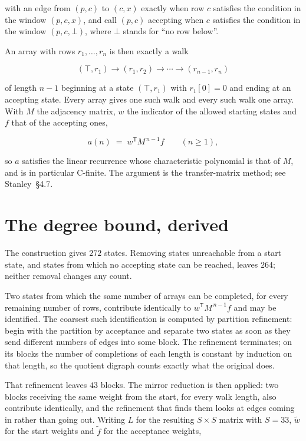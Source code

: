 \documentclass[11pt]{article}
\theoremstyle{definition}
\begin{document}
with an edge from $(p,c)$ to $(c,x)$ exactly when row $c$ satisfies the condition in the window $(p,c,x)$, and call $(p,c)$ accepting when $c$ satisfies the condition in the window $(p,c,\bot)$, where $\bot$ stands for ``no row below''.

An array with rows $r_1,\dots,r_n$ is then exactly a walk

\[(\top,r_1) \to (r_1,r_2) \to \cdots \to (r_{n-1},r_n)\]

of length $n-1$ beginning at a state $(\top,r_1)$ with $r_1[0]=0$ and ending at an accepting state. Every array gives one such walk and every such walk one array. With $M$ the adjacency matrix, $w$ the indicator of the allowed starting states and $f$ that of the accepting ones,

\[a(n) \;=\; w^{\mathsf T} M^{\,n-1} f \qquad (n \ge 1),\]

so $a$ satisfies the linear recurrence whose characteristic polynomial is that of $M$, and is in particular C-finite. The argument is the transfer-matrix method; see Stanley~\S4.7.

\section{The degree bound, derived}

The construction gives $272$ states. Removing states unreachable from a start state, and states from which no accepting state can be reached, leaves $264$; neither removal changes any count.

Two states from which the same number of arrays can be completed, for every remaining number of rows, contribute identically to $w^{\mathsf T}M^{\,n-1}f$ and may be identified. The coarsest such identification is computed by partition refinement: begin with the partition by acceptance and separate two states as soon as they send different numbers of edges into some block. The refinement terminates; on its blocks the number of completions of each length is constant by induction on that length, so the quotient digraph counts exactly what the original does.

That refinement leaves $43$ blocks. The mirror reduction is then applied: two blocks receiving the same weight from the start, for every walk length, also contribute identically, and the refinement that finds them looks at edges coming in rather than going out. Writing $L$ for the resulting $S \times S$ matrix with $S = 33$, $\tilde w$ for the start weights and $\tilde f$ for the acceptance weights,
\end{document}
